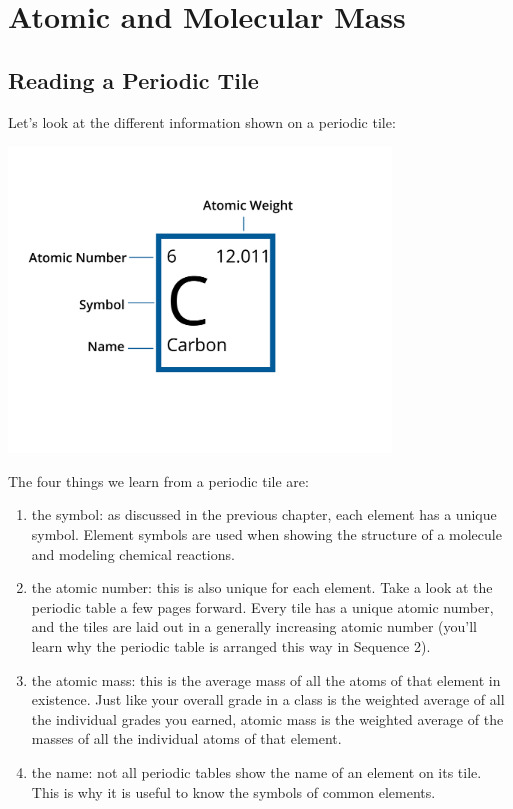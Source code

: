 \chapter{Atomic and Molecular Mass}


\section{Reading a Periodic Tile}

Let's look at the different information shown on a periodic tile:

\begin{center}
\includegraphics[width = 4in]{element.png}
\end{center}

The four things we learn from a periodic tile are:
\begin{enumerate}
\item the symbol: as discussed in the previous chapter, each element has a 
unique symbol. Element symbols are used when showing the structure of a molecule
and modeling chemical reactions. 
\item the atomic number: this is also unique for each element. Take a look at the
periodic table a few pages forward. Every tile has a unique atomic number, and 
the tiles are laid out in a generally increasing atomic number (you'll learn why
the periodic table is arranged this way in Sequence 2). 
\item the atomic mass: this is the average mass of all the atoms of that element
in existence. Just like your overall grade in a class is the weighted average of
all the individual grades you earned, atomic mass is the weighted average of the
masses of all the individual atoms of that element. 
\item the name: not all periodic tables show the name of an element on its tile.
This is why it is useful to know the symbols of common elements. 
\end{enumerate}

